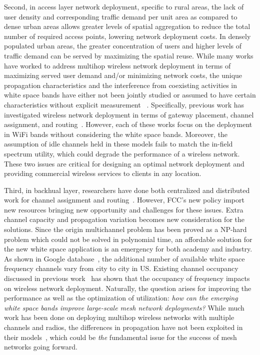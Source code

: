 Second, in access layer network deployment, specific to rural areas, 
the lack of user density and corresponding traffic demand per unit area 
as compared to dense urban areas allows greater levels of spatial 
aggregation to reduce the total number of required access points, 
lowering network deployment costs. In densely populated urban areas, 
the greater concentration of users and higher levels of traffic demand 
can be served by maximizing the spatial reuse. While many works have 
worked to address multihop wireless network deployment in terms of 
maximizing served user demand and/or minimizing network costs, the 
unique propagation characteristics and the interference from coexisting
activities in white space bands have either not been jointly studied 
or assumed to have certain characteristics without explicit measurement
~\cite{si2010overview}. Specifically, previous work has investigated 
wireless network deployment in terms of gateway placement, channel 
assignment, and routing~\cite{he2008optimizing,marina2010topology}.
However, each of these works focus on the deployment in WiFi bands 
without considering the white space bands. Moreover, the assumption 
of idle channels held in these models fails to match the in-field 
spectrum utility, which could degrade the performance of a wireless 
network. These two issues are critical for designing an optimal 
network deployment and providing commercial wireless services to 
clients in any location.

Third, in backhual layer, researchers have done both centralized and 
distributed work for channel assignment and routing~\cite{raniwala2004centralized,wu2006distributed}.
However, FCC's new policy import new resources bringing new opportunity
and challenges for these issues.  Extra channel capacity and 
propagation variation becomes new consideration for the solutions.
Since the origin multichannel problem has been proved as a NP-hard
problem which could not be solved in polynomial time, an affordable 
solution for the new white space application is an emergency for 
both academy and industry. As shown in Google database~\cite{googledatabase}, 
the additional number of available white space frequency channels 
vary from city to city in US. Existing channel occupancy discussed in 
previous work~\cite{pcuiwinmee} has shown that the occupancy of 
frequency impacts on wireless network deployment. Naturally, the 
question arises for improving the performance as well as the optimization 
of utilization: {\it how can the emerging white space bands improve 
large-scale mesh network deployments?}  While much work has been done 
on deploying multihop wireless networks with multiple channels and 
radios, the differences in propagation have not been exploited in their 
models~\cite{tang2005interference, long2013fair,doraghinejad2014channel}, 
which could be {\it the} fundamental issue for the success of mesh 
networks going forward.

